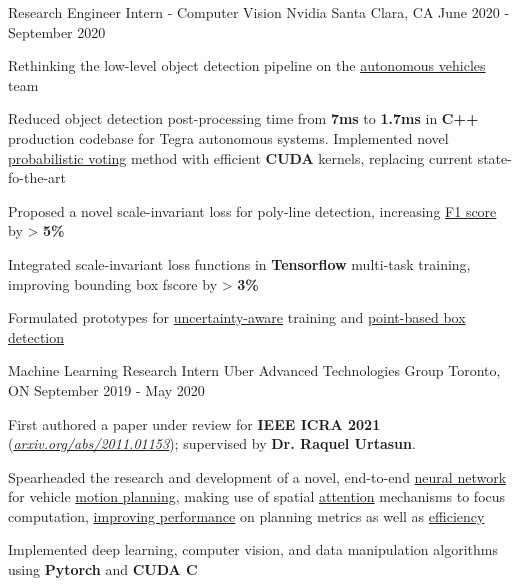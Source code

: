 
\begin{cventries}
  \cventry
    {Research Engineer Intern - Computer Vision} %
    {Nvidia} %
    {Santa Clara, CA} %
    {June 2020 - September 2020} %
    {
      \begin{cvitems} %
        \item {Rethinking the low-level object detection pipeline on the \underline{autonomous vehicles} team}
        \item {Reduced object detection post-processing time from \textbf{7ms}
        to \textbf{1.7ms} in \textbf{C++} production codebase for Tegra
        autonomous systems. Implemented novel \underline{probabilistic voting}
        method with efficient \textbf{CUDA} kernels, replacing current
        state-fo-the-art}
        \item {Proposed a novel scale-invariant loss for poly-line detection, increasing \underline{F1 score} by > \textbf{5\%}}
        \item {Integrated scale-invariant loss functions in \textbf{Tensorflow} multi-task training, improving bounding box fscore by > \textbf{3\%}}
        \item {Formulated prototypes for \underline{uncertainty-aware} training and \underline{point-based box detection}}
      \end{cvitems}
    }

  \cventry
    {Machine Learning Research Intern} %
    {Uber Advanced Technologies Group} %
    {Toronto, ON} %
    {September 2019 - May 2020} %
    {
      \begin{cvitems} %
        \item {First authored a paper under review for \textbf{IEEE ICRA 2021}} (\href{https://arxiv.org/pdf/2011.01153.pdf}{\underline{\textit{arxiv.org/abs/2011.01153}}});
        supervised by \textbf{Dr. Raquel Urtasun}.
        \item {Spearheaded the research and development of a novel, end-to-end
        \underline{neural network} for vehicle \underline{motion planning}, making use of
        spatial \underline{attention} mechanisms to focus computation, \underline{improving performance}
        on planning metrics as well as \underline{efficiency}}
        \item {Implemented deep learning, computer vision, and data manipulation algorithms using \textbf{Pytorch} and \textbf{CUDA C}}
      \end{cvitems}
    }


\end{cventries}
